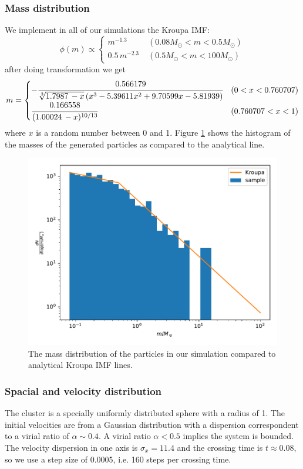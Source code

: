 \subsubsection*{Mass distribution}
We implement in all of our simulations the Kroupa IMF:
\begin{equation}
\phi(m) \propto 
\begin{cases}
m^{-1.3} \; &(0.08M_\odot < m < 0.5M_\odot) \\
0.5 \, m^{-2.3} \; &(0.5M_\odot<m<100M_\odot)
\end{cases}
\end{equation}
after doing transformation we get
\begin{equation}
m=
	\begin{cases}
	-\cfrac{0.566179}{\sqrt[3]{1.7987\, - x} \left(x^3-5.39611 
	x^2+9.70599 x-5.81939\right)} & (0<x<0.760707) \\
	\cfrac{0.166558}{(1.00024\, -x)^{10/13}} & (0.760707<x<1)
	\end{cases}
\end{equation}
where $ x $ is a random number between 0 and 1. Figure \ref{fig:imf} shows the 
histogram of the masses of the generated particles as compared to the analytical line.
\begin{figure}[h]
	\centering
	\includegraphics[width=.6\columnwidth]{../simulations/imf.pdf}
	\caption{The mass distribution of the particles in our simulation compared to analytical 
	Kroupa IMF lines.}
	\label{fig:imf}
\end{figure}

\subsubsection*{Spacial and velocity distribution}
The cluster is a specially uniformly distributed sphere with a radius of 1. The initial 
velocities are from a  Gaussian distribution with a dispersion correspondent to a virial ratio 
of $ \alpha \sim 0.4 $. A virial ratio $ \alpha < 0.5 $ implies the system is bounded. The 
velocity dispersion in one axis is $ \sigma_x = 11.4 $ and the crossing time is $ t \approx 
0.08 $, so we use a step size of 0.0005, i.e. 160 steps per crossing time.

